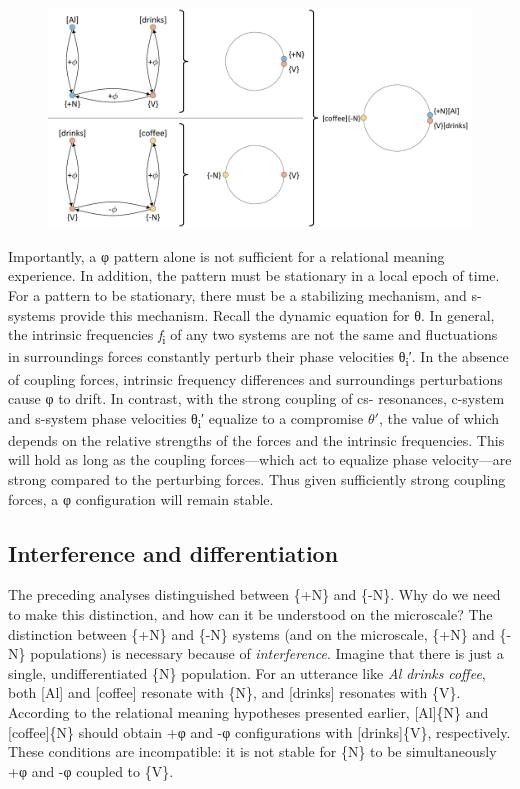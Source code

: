  
\begin{figure}
\includegraphics[width=\textwidth]{figures/Tilsen-img22.png}
\caption{\missingcaption}
\label{fig:}
\end{figure}
 

  Importantly, a φ pattern alone is not sufficient for a relational meaning experience. In addition, the pattern must be stationary in a local epoch of time. For a pattern to be stationary, there must be a stabilizing mechanism, and s-systems provide this mechanism. Recall the dynamic equation for θ. In general, the intrinsic frequencies \textit{f}\textsubscript{i} of any two systems are not the same and fluctuations in surroundings forces constantly perturb their phase velocities θ\textsubscript{i}′. In the absence of coupling forces, intrinsic frequency differences and surroundings perturbations cause φ to drift. In contrast, with the strong coupling of cs- resonances, c-system and s-system phase velocities θ\textsubscript{i}′ equalize to a compromise $\theta ′$, the value of which depends on the relative strengths of the forces and the intrinsic frequencies. This will hold as long as the coupling forces—which act to equalize phase velocity—are strong compared to the perturbing forces. Thus given sufficiently strong coupling forces, a φ configuration will remain stable.

\subsection{Interference and differentiation}

The preceding analyses distinguished between \{+N\} and \{-N\}. Why do we need to make this distinction, and how can it be understood on the microscale? The distinction between \{+N\} and \{-N\} systems (and on the microscale, \{+N\} and \{-N\} populations) is necessary because of \textit{interference}. Imagine that there is just a single, undifferentiated \{N\} population. For an utterance like \textit{Al} \textit{drinks} \textit{coffee}, both [Al] and [coffee] resonate with \{N\}, and [drinks] resonates with \{V\}. According to the relational meaning hypotheses presented earlier, [Al]\{N\} and [coffee]\{N\} should obtain +φ and -φ configurations with [drinks]\{V\}, respectively. These conditions are incompatible: it is not stable for \{N\} to be simultaneously +φ and -φ coupled to \{V\}.

